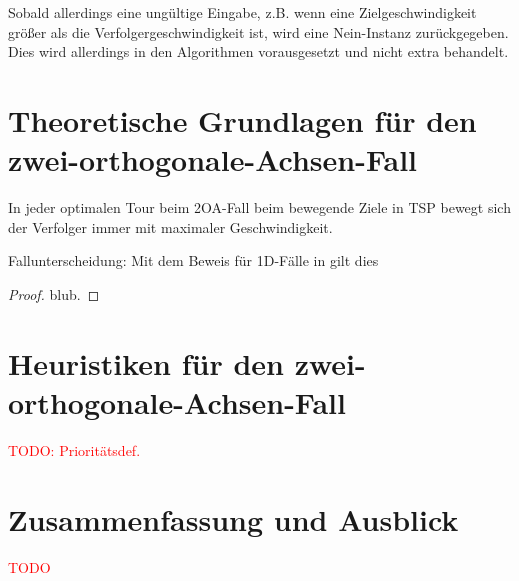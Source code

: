 \documentclass[german,version-2019-11]{uzl-thesis}
\begin{document}
Sobald allerdings eine ungültige Eingabe, z.B. wenn eine Zielgeschwindigkeit größer als die Verfolgergeschwindigkeit ist, wird eine \glqq Nein\grqq-Instanz zurückgegeben. Dies wird allerdings in den Algorithmen vorausgesetzt und nicht extra behandelt. 

\chapter{Theoretische Grundlagen für den zwei-orthogonale-Achsen-Fall}

\begin{lemma}
In jeder optimalen Tour beim 2OA-Fall beim bewegende Ziele in TSP bewegt sich der Verfolger immer mit maximaler Geschwindigkeit.
\end{lemma}
Fallunterscheidung:
Mit dem Beweis für 1D-Fälle in \cite{Helvig} gilt dies 
\begin{proof}
blub.
\end{proof}



\chapter{Heuristiken für den zwei-orthogonale-Achsen-Fall}
\begin{definition}
\textcolor{red}{TODO: Prioritätsdef.}

\end{definition}

\chapter{Zusammenfassung und Ausblick}
\textcolor{red}{TODO}
\end{document}
